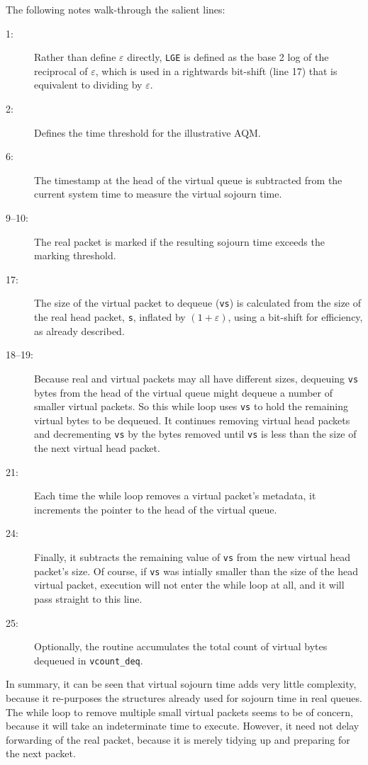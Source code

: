The following notes walk-through the salient lines:
\begin{description}
	\item[1:] Rather than define \(\varepsilon\) directly, \texttt{LGE} is defined as the base 2 log of the reciprocal of \(\varepsilon\), which is used in a rightwards bit-shift (line 17) that is equivalent to dividing by  \(\varepsilon\).
	\item[2:] Defines the time threshold for the illustrative AQM.
	\item[6:] The timestamp at the head of the virtual queue is subtracted from the current system time to measure the virtual sojourn time.
	\item[9--10:] The real packet is marked if the resulting sojourn time exceeds the marking threshold.
	\item[17:] The size of the virtual packet to dequeue (\texttt{vs}) is calculated from the size of the real head packet, \texttt{s}, inflated by \((1+\varepsilon)\), using a bit-shift for efficiency, as already described.
	\item[18--19:] Because real and virtual packets may all have different sizes, dequeuing \texttt{vs} bytes from the head of the virtual queue might dequeue a number of smaller virtual packets. So this while loop uses \texttt{vs} to hold the remaining virtual bytes to be dequeued. It continues removing virtual head packets and decrementing \texttt{vs} by the bytes removed until \texttt{vs} is less than the size of the next virtual head packet.
	\item[21:] Each time the while loop removes a virtual packet's metadata, it increments the pointer to the head of the virtual queue.
	\item[24:] Finally, it subtracts the remaining value of \texttt{vs} from the new virtual head packet's size. Of course, if \texttt{vs} was intially smaller than the size of the head virtual packet, execution will not enter the while loop at all, and it will pass straight to this line.
	\item[25:] Optionally, the routine accumulates the total count of virtual bytes dequeued in \texttt{vcount\_deq}.
\end{description}

In summary, it can be seen that virtual sojourn time adds very little complexity, because it re-purposes the structures already used for sojourn time in real queues. The while loop to remove multiple small virtual packets seems to be of concern, because it will take an indeterminate time to execute. However, it need not delay forwarding of the real packet, because it is merely tidying up and preparing for the next packet.

